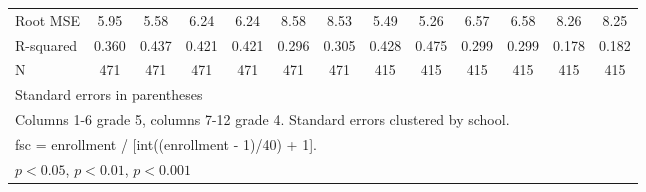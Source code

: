{\begin{tabular}{l*{12}{c}}
\midrule
Root MSE    &        5.95         &        5.58         &        6.24         &        6.24         &        8.58         &        8.53         &        5.49         &        5.26         &        6.57         &        6.58         &        8.26         &        8.25         \\
R-squared   &       0.360         &       0.437         &       0.421         &       0.421         &       0.296         &       0.305         &       0.428         &       0.475         &       0.299         &       0.299         &       0.178         &       0.182         \\
N           &         471         &         471         &         471         &         471         &         471         &         471         &         415         &         415         &         415         &         415         &         415         &         415         \\
\bottomrule
\multicolumn{13}{l}{\footnotesize Standard errors in parentheses}\\
\multicolumn{13}{l}{\footnotesize Columns 1-6 grade 5, columns 7-12 grade 4. Standard errors clustered by school.}\\
\multicolumn{13}{l}{\footnotesize fsc = enrollment / [int((enrollment - 1)/40) + 1].}\\
\multicolumn{13}{l}{\footnotesize \sym{*} \(p<0.05\), \sym{**} \(p<0.01\), \sym{***} \(p<0.001\)}\\
\end{tabular}
}
